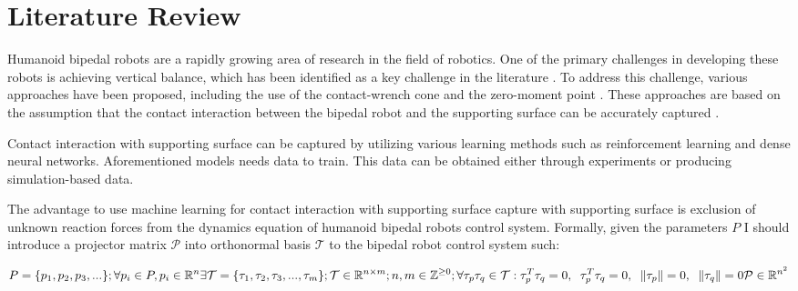 \chapter{Literature Review}
\label{chap:lr}

\vspace{4mm}
Humanoid bipedal robots are a rapidly growing area of research in the field of robotics. One of the primary challenges in developing these robots is achieving vertical balance, which has been identified as a key challenge in the literature \cite{Savin2017,cwc7139910}. To address this challenge, various approaches have been proposed, including the use of the contact-wrench cone \cite{cwc7139910} and the zero-moment point \cite{zmp1241826}. These approaches are based on the assumption that the contact interaction between the bipedal robot and the supporting surface can be accurately captured \cite{Savin8875522}.

\vspace{4mm}

Contact interaction with supporting surface can be captured by utilizing various learning methods such as reinforcement learning\cite{rl48550} and dense neural networks\cite{dnn8501736}. Aforementioned models needs data to train. This data can be obtained either through experiments or producing simulation-based data. 

\vspace{4mm}

The advantage to use machine learning for contact interaction with supporting surface capture with supporting surface is exclusion of unknown reaction forces from the dynamics equation of humanoid bipedal robots control system\cite{Savin8875522}. Formally, given the parameters $P$ I should introduce a projector matrix $\mathcal{P}$ into orthonormal basis $\mathcal{T}$ to the bipedal robot control system such:
\vspace{4mm}

\begin{equation}
\label{eq:def} 
P = \{p_1, p_2, p_3, ...\} ; \forall p_i \in P, p_i \in \mathbb{R}^n
\\
\exists \mathcal{T} = \{ \tau_1,\tau_2,\tau_3,...,\tau_m \};  \mathcal{T} \in \mathbb{R}^{n \times m}; n,m \in \mathbb{Z}^{\ge0};\\ \forall \tau_p \tau_q \in \mathcal{T} :
\\
\tau_p^T \tau_q = 0 , \hspace{2mm}
     \tau_p^T \tau_q = 0 , \hspace{2mm}
     \|\tau_p\|=0 , \hspace{2mm}
     \|\tau_q\|=0 
     \\ \mathcal{P} \in \mathbb{R}^{n^2}
\end{equation}

